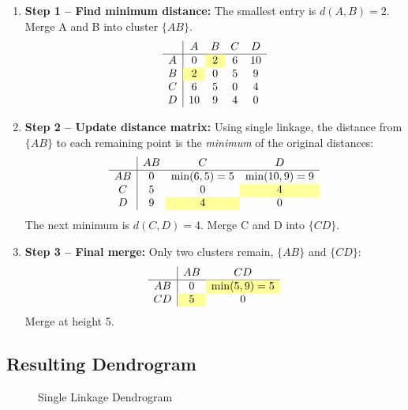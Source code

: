 \documentclass{article}
\begin{document}
\begin{enumerate}
    \item \textbf{Step 1 -- Find minimum distance:} The smallest entry is $d(A,B) = 2$. Merge A and B into cluster $\{AB\}$.
    \[
    \begin{array}{c|cccc}
        & A & B & C & D \\
    \hline
    A & 0 & \cellcolor{highlight}2 & 6 & 10 \\
    B & \cellcolor{highlight}2 & 0 & 5 & 9  \\
    C & 6 & 5 & 0 & 4  \\
    D & 10 & 9 & 4 & 0  \\
    \end{array}
    \]

    \item \textbf{Step 2 -- Update distance matrix:} Using single linkage, the distance from $\{AB\}$ to each remaining point is the \emph{minimum} of the original distances:
    \[
    \begin{array}{c|ccc}
        & AB & C & D \\
    \hline
    AB & 0 & \min(6,5)=5 & \min(10,9)=9 \\
    C  & 5 & 0 & \cellcolor{highlight}4 \\
    D  & 9 & \cellcolor{highlight}4 & 0 \\
    \end{array}
    \]
    The next minimum is $d(C,D) = 4$. Merge C and D into $\{CD\}$.

    \item \textbf{Step 3 -- Final merge:} Only two clusters remain, $\{AB\}$ and $\{CD\}$:
    \[
    \begin{array}{c|cc}
        & AB & CD \\
    \hline
    AB & 0 & \cellcolor{highlight}{\min(5,9)=5} \\
    CD & \cellcolor{highlight}5 & 0 \\
    \end{array}
    \]
    Merge at height 5.
\end{enumerate}

\subsection{Resulting Dendrogram}

\begin{figure}[h]
    \centering
    \caption{Single Linkage Dendrogram}
    \label{fig:single_linkage_dendrogram}
\end{figure}
\end{document}
